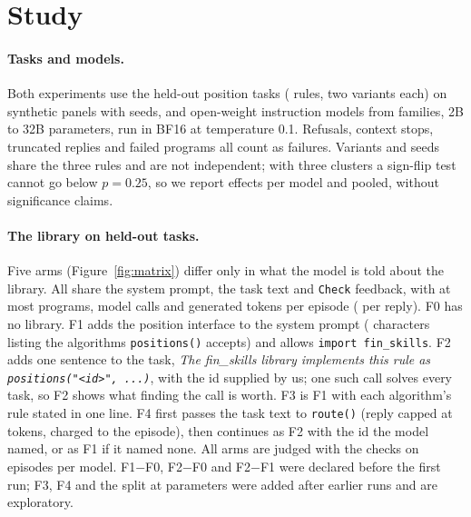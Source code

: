 \section{Study}
\label{sec:study}

\paragraph{Tasks and models.}
Both experiments use the \StudyHeldTasks{} held-out position tasks (\StudyAlgorithms{} rules, two
variants each) on synthetic panels with \StudySeeds{} seeds, and \StudyModels{} open-weight
instruction models from \StudyFamilies{} families, 2B to 32B parameters, run in BF16 at
temperature 0.1. Refusals, context stops, truncated replies and failed programs all count as
failures. Variants and seeds share the three rules and are not independent; with three clusters
a sign-flip test cannot go below $p=0.25$, so we report effects per model and pooled, without
significance claims.

\paragraph{The library on held-out tasks.}
Five arms (Figure~\ref{fig:matrix}) differ only in what the model is told about the library.
All share the system prompt, the task text and \texttt{Check} feedback, with at most
\FixAttempts{} programs, \FixCalls{} model calls and \FixTokens{} generated tokens per episode
(\FixOutputCap{} per reply). F0 has no library. F1 adds the position interface to the system
prompt (\FixInterfaceChars{} characters listing the \FixInterfaceAlgorithms{} algorithms
\texttt{positions()} accepts) and allows \texttt{import fin\_skills}. F2 adds one sentence to the
task, \emph{The fin\_skills library implements this rule as \texttt{positions("<id>", ...)}},
with the id supplied by us; one such call solves every task, so F2 shows what finding the call
is worth. F3 is F1 with each algorithm's rule stated in one line. F4 first passes the task text
to \texttt{route()} (reply capped at \FixRouteCap{} tokens, charged to the episode), then
continues as F2 with the id the model named, or as F1 if it named none. All arms are judged
with the \FixVisibleChecks{} checks on \FixEpisodesPerArm{} episodes per model. F1$-$F0,
F2$-$F0 and F2$-$F1 were declared before the first run; F3, F4 and the split at
\FixSizeCut{} parameters were added after earlier runs and are exploratory.

